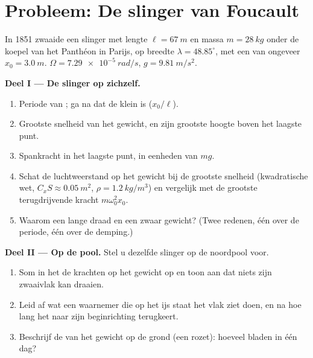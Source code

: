 \section{Probleem: De slinger van Foucault}

\begin{problem}
\label{pb:b1:non-inertial-frames:1}
In 1851 zwaaide een slinger met lengte $\ell = \qty{67}{m}$ en massa $m = \qty{28}{kg}$
onder de koepel van het Panthéon in Parijs, op breedte $\lambda =
48.85^\circ$, met een  van ongeveer $x_0 = \qty{3.0}{m}$. $\Omega =
\qty{7.29e-5}{rad/s}$, $g = \qty{9.81}{m/s^2}$.

\medskip
\noindent\textbf{Deel I --- De slinger op zichzelf.}
\begin{enumerate}
  \item Periode van ; ga na dat de  klein is
        ($x_0/\ell$).
  \item Grootste snelheid van het gewicht, en zijn grootste hoogte boven het
        laagste punt.
  \item Spankracht in het laagste punt, in eenheden van $mg$.
  \item Schat de luchtweerstand op het gewicht bij de grootste snelheid (kwadratische
        wet, $C_xS \approx \qty{0.05}{m^2}$, $\rho = \qty{1.2}{kg/m^3}$) en
        vergelijk met de grootste terugdrijvende kracht $m\omega_0^2x_0$.
  \item Waarom een lange draad en een zwaar gewicht? (Twee redenen, één over de
        periode, één over de demping.)
\end{enumerate}

\medskip
\noindent\textbf{Deel II --- Op de pool.}
Stel u dezelfde slinger op de noordpool voor.
\begin{enumerate}[resume]
  \item Som in het  de krachten op het gewicht op en toon
        aan dat niets zijn zwaaivlak kan draaien.
  \item Leid af wat een waarnemer die op het ijs staat het vlak ziet doen,
        en na hoe lang het naar zijn beginrichting terugkeert.
  \item Beschrijf de  van het gewicht op de grond (een rozet): hoeveel
        bladen in één dag?
\end{enumerate}


\end{problem}
